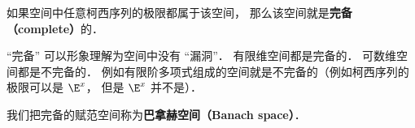 

如果空间中任意柯西序列的极限都属于该空间， 那么该空间就是\textbf{完备（complete）}的．

“完备” 可以形象理解为空间中没有 “漏洞”． 有限维空间都是完备的． 可数维空间都是不完备的． 例如有限阶多项式组成的空间就是不完备的（例如柯西序列的极限可以是 $\E^x$， 但是 $\E^x$ 并不是）．

我们把完备的赋范空间称为\textbf{巴拿赫空间（Banach space）}．
